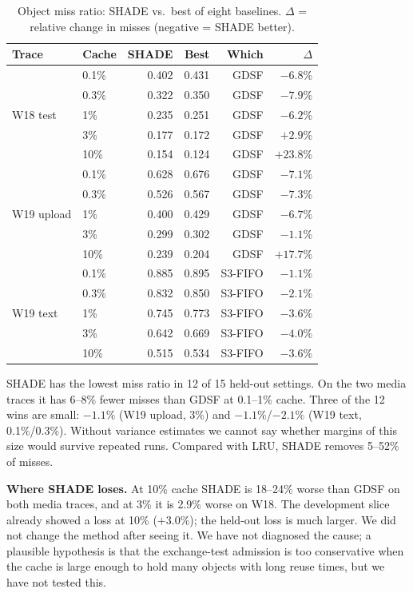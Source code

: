 \documentclass[conference]{IEEEtran}
\begin{document}
\begin{table}[t]
\centering
\caption{Object miss ratio: SHADE vs.\ best of eight baselines. $\Delta$ = relative change in misses (negative =
SHADE better).}\label{tab:main}
\setlength{\tabcolsep}{4pt}
\begin{tabular}{@{}llrrrr@{}}
\toprule
Trace & Cache & SHADE & Best & Which & $\Delta$ \\
\midrule
\multirow{5}{*}{W18 test} & 0.1\% & 0.402 & 0.431 & GDSF & $-6.8\%$ \\
 & 0.3\% & 0.322 & 0.350 & GDSF & $-7.9\%$ \\
 & 1\% & 0.235 & 0.251 & GDSF & $-6.2\%$ \\
 & 3\% & 0.177 & 0.172 & GDSF & $+2.9\%$ \\
 & 10\% & 0.154 & 0.124 & GDSF & $+23.8\%$ \\
\midrule
\multirow{5}{*}{W19 upload} & 0.1\% & 0.628 & 0.676 & GDSF & $-7.1\%$ \\
 & 0.3\% & 0.526 & 0.567 & GDSF & $-7.3\%$ \\
 & 1\% & 0.400 & 0.429 & GDSF & $-6.7\%$ \\
 & 3\% & 0.299 & 0.302 & GDSF & $-1.1\%$ \\
 & 10\% & 0.239 & 0.204 & GDSF & $+17.7\%$ \\
\midrule
\multirow{5}{*}{W19 text} & 0.1\% & 0.885 & 0.895 & S3-FIFO & $-1.1\%$ \\
 & 0.3\% & 0.832 & 0.850 & S3-FIFO & $-2.1\%$ \\
 & 1\% & 0.745 & 0.773 & S3-FIFO & $-3.6\%$ \\
 & 3\% & 0.642 & 0.669 & S3-FIFO & $-4.0\%$ \\
 & 10\% & 0.515 & 0.534 & S3-FIFO & $-3.6\%$ \\
\bottomrule
\end{tabular}
\end{table}

SHADE has the lowest miss ratio in 12 of 15 held-out settings. On the two media traces it has 6--8\% fewer misses
than GDSF at 0.1--1\% cache. Three of the 12 wins are small: $-1.1\%$ (W19 upload, 3\%) and $-1.1\%$/$-2.1\%$ (W19
text, 0.1\%/0.3\%). Without variance estimates we cannot say whether margins of this size would survive repeated
runs. Compared with LRU, SHADE removes 5--52\% of misses.

\textbf{Where SHADE loses.} At 10\% cache SHADE is 18--24\% worse than GDSF on both media traces, and at 3\% it is
2.9\% worse on W18. The development slice already showed a loss at 10\% ($+3.0\%$); the held-out loss is much
larger. We did not change the method after seeing it. We have not diagnosed the cause; a plausible hypothesis is that
the exchange-test admission is too conservative when the cache is large enough to hold many objects with long reuse
times, but we have not tested this.
\end{document}
